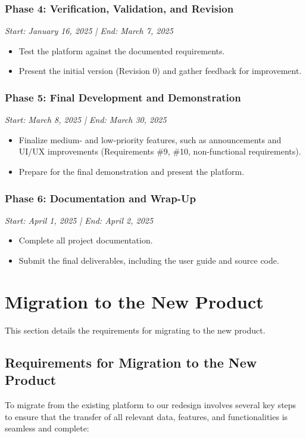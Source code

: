 \documentclass[12pt, titlepage]{article}
\begin{document}
\subsubsection{Phase 4: Verification, Validation, and Revision}
\textit{Start: January 16, 2025 | End: March 7, 2025}
\begin{itemize}
    \item Test the platform against the documented requirements.
    \item Present the initial version (Revision 0) and gather feedback for improvement.
\end{itemize}

\subsubsection{Phase 5: Final Development and Demonstration}
\textit{Start: March 8, 2025 | End: March 30, 2025}
\begin{itemize}
    \item Finalize medium- and low-priority features, such as announcements and UI/UX improvements (Requirements \#9, \#10, non-functional requirements).
    \item Prepare for the final demonstration and present the platform.
\end{itemize}

\subsubsection{Phase 6: Documentation and Wrap-Up}
\textit{Start: April 1, 2025 | End: April 2, 2025}
\begin{itemize}
    \item Complete all project documentation.
    \item Submit the final deliverables, including the user guide and source code.
\end{itemize}


\section{Migration to the New Product}
This section details the requirements for migrating to the new product.
\subsection{Requirements for Migration to the New Product}
To migrate from the existing platform to our redesign involves several key steps to ensure that the transfer of all relevant data, features, and functionalities is seamless and complete:
\end{document}
